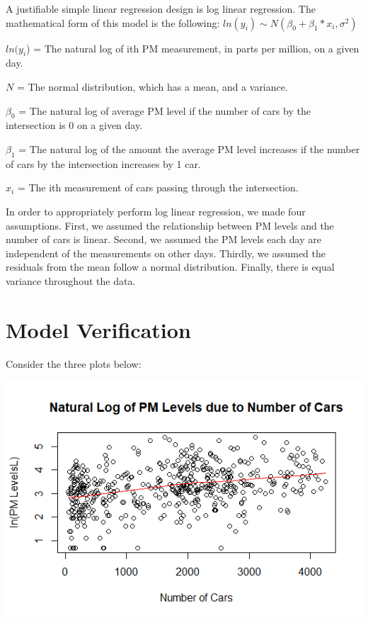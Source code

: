 \documentclass[12pt]{article}\usepackage[]{graphicx}\usepackage[]{color}
\begin{document}
A justifiable simple linear regression design is log linear regression. The mathematical form of this model is the following:
$ln(y_i) \sim N(\beta_0 + \beta_1*x_i, \sigma^2)$

$ln(y_i$) = The natural log of ith PM measurement, in parts per million, on a given day. 

$N$ = The normal distribution, which has a mean, and a variance.

$\beta_0$ = The natural log of average PM level if the number of cars by the intersection is 0 on a given day.

$\beta_1$ = The natural log of the amount the average PM level increases if the number of cars by the intersection increases by 1 car.

$x_i$ = The ith measurement of cars passing through the intersection. 




In order to appropriately perform log linear regression, we made four assumptions. First, we assumed the relationship between PM levels and the number of cars is linear. Second, we assumed the PM levels each day are independent of the measurements on other days. Thirdly, we assumed the residuals from the mean follow a normal distribution. Finally, there is equal variance throughout the data. 


\section{Model Verification}


Consider the three plots below: \newline

\includegraphics{scatterplot.png}
\end{document}
